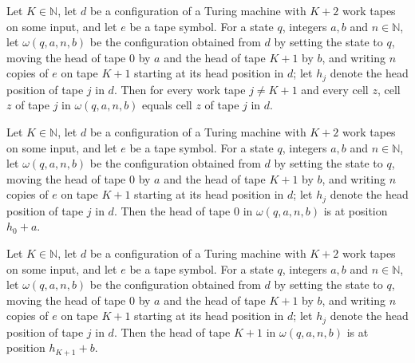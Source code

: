 \begin{lemma}
\label{Turing.cw_cfg_tape}
\leanok
{}
Let $K\in\mathbb{N}$, let $d$ be a configuration of a Turing machine with $K+2$ work tapes on
some input, and let $e$ be a tape symbol. For a state $q$, integers $a,b$ and $n\in\mathbb{N}$,
let $\omega(q,a,n,b)$ be the configuration obtained from $d$ by setting the state to $q$,
moving the head of tape $0$ by $a$ and the head of tape $K+1$ by $b$, and writing $n$ copies of
$e$ on tape $K+1$ starting at its head position in $d$; let $h_j$ denote the head position of
tape $j$ in $d$. Then for every work tape $j\ne K+1$ and every cell $z$, cell $z$ of tape $j$
in $\omega(q,a,n,b)$ equals cell $z$ of tape $j$ in $d$.
\end{lemma}

\begin{lemma}
\label{Turing.cw_cfg_pos₀}
\leanok
{}
Let $K\in\mathbb{N}$, let $d$ be a configuration of a Turing machine with $K+2$ work tapes on
some input, and let $e$ be a tape symbol. For a state $q$, integers $a,b$ and $n\in\mathbb{N}$,
let $\omega(q,a,n,b)$ be the configuration obtained from $d$ by setting the state to $q$,
moving the head of tape $0$ by $a$ and the head of tape $K+1$ by $b$, and writing $n$ copies of
$e$ on tape $K+1$ starting at its head position in $d$; let $h_j$ denote the head position of
tape $j$ in $d$. Then the head of tape $0$ in $\omega(q,a,n,b)$ is at position $h_0+a$.
\end{lemma}

\begin{lemma}
\label{Turing.cw_cfg_posL}
\leanok
{}
Let $K\in\mathbb{N}$, let $d$ be a configuration of a Turing machine with $K+2$ work tapes on
some input, and let $e$ be a tape symbol. For a state $q$, integers $a,b$ and $n\in\mathbb{N}$,
let $\omega(q,a,n,b)$ be the configuration obtained from $d$ by setting the state to $q$,
moving the head of tape $0$ by $a$ and the head of tape $K+1$ by $b$, and writing $n$ copies of
$e$ on tape $K+1$ starting at its head position in $d$; let $h_j$ denote the head position of
tape $j$ in $d$. Then the head of tape $K+1$ in $\omega(q,a,n,b)$ is at position $h_{K+1}+b$.
\end{lemma}

